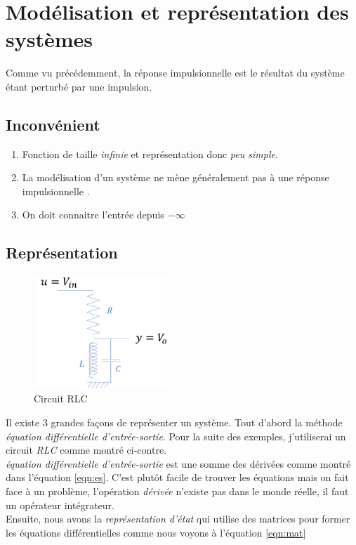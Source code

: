 \documentclass{report}
\begin{document}
\section{Modélisation et représentation des systèmes}
Comme vu précédemment, la réponse impulsionnelle est le résultat du système étant perturbé par une impulsion. 
\subsection{Inconvénient}
\begin{enumerate}
\item Fonction de taille \textit{infinie} et représentation donc \textit{peu simple}.
\item La modélisation d'un système ne mène généralement pas à une réponse impulsionnelle .
\item On doit connaitre l'entrée depuis $-\infty$
\end{enumerate}


\subsection{Représentation}
\begin{figure}
\includegraphics[width=5cm]{img/RLC.png}
\caption{Circuit RLC}
\label{fig:RLC}
\end{figure}
Il existe 3 grandes façons de représenter un système. Tout d'abord la méthode \textit{équation différentielle d'entrée-sortie}. Pour la suite des exemples, j'utiliserai un circuit \textit{RLC} comme montré ci-contre.\\

\textit{équation différentielle d'entrée-sortie} est une somme des dérivées comme montré dans l'équation \ref{eqn:es}. C'est plutôt facile de trouver les équations mais on fait face à un problème, l'opération \textit{dérivée} n'existe pas dans le monde réelle, il faut un opérateur intégrateur.\\

Ensuite, nous avons la \textit{représentation d'état} qui utilise des matrices pour former les équations différentielles comme nous voyons à l'équation \ref{eqn:mat}\\
\end{document}
